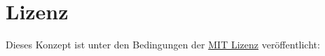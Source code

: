 

%  

\section{Lizenz} %

Dieses Konzept ist unter den Bedingungen der
\href{https://opensource.org/licenses/mit-license.php}{MIT Lizenz}
veröffentlicht:

\begin{figure}[H]
    \scriptsize
\end{figure}
